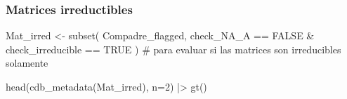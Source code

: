\documentclass[
  12pt,
  letterpaper,
]{book}
\newenvironment{Shaded}{\begin{snugshade}}{\end{snugshade}}
\newcommand{\AttributeTok}[1]{\textcolor[rgb]{0.40,0.45,0.13}{#1}}
\newcommand{\CommentTok}[1]{\textcolor[rgb]{0.37,0.37,0.37}{#1}}
\newcommand{\ConstantTok}[1]{\textcolor[rgb]{0.56,0.35,0.01}{#1}}
\newcommand{\DecValTok}[1]{\textcolor[rgb]{0.68,0.00,0.00}{#1}}
\newcommand{\FunctionTok}[1]{\textcolor[rgb]{0.28,0.35,0.67}{#1}}
\newcommand{\NormalTok}[1]{\textcolor[rgb]{0.00,0.23,0.31}{#1}}
\newcommand{\OtherTok}[1]{\textcolor[rgb]{0.00,0.23,0.31}{#1}}
\newcommand{\SpecialCharTok}[1]{\textcolor[rgb]{0.37,0.37,0.37}{#1}}
\begin{document}
\begin{table}
\begin{tabular*}{\linewidth}{@{\extracolsep{\fill}}rlllllllllllllllllllrllrrrrllllrrrrllllllllrlrrlrllllrrlllcccccccccccccc}
\bottomrule
\end{tabular*}
\end{table}

\subsubsection{Matrices irreductibles}\label{matrices-irreductibles}

\begin{Shaded}
\begin{Highlighting}[]
\NormalTok{Mat\_irred }\OtherTok{\textless{}{-}} \FunctionTok{subset}\NormalTok{(}
\NormalTok{  Compadre\_flagged,}
\NormalTok{  check\_NA\_A }\SpecialCharTok{==} \ConstantTok{FALSE} \SpecialCharTok{\&}\NormalTok{ check\_irreducible }\SpecialCharTok{==} \ConstantTok{TRUE}
\NormalTok{) }\CommentTok{\# para evaluar si las matrices son irreducibles solamente}

\FunctionTok{head}\NormalTok{(}\FunctionTok{cdb\_metadata}\NormalTok{(Mat\_irred), }\AttributeTok{n=}\DecValTok{2}\NormalTok{) }\SpecialCharTok{|\textgreater{}} 
  \FunctionTok{gt}\NormalTok{()}
\end{Highlighting}
\end{Shaded}
\end{document}
